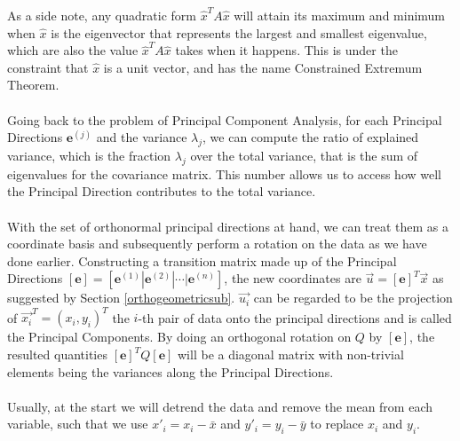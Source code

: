 As a side note, any quadratic form $\hat{x}^TA\hat{x}$ will attain its maximum and minimum when $\hat{x}$ is the eigenvector that represents the largest and smallest eigenvalue, which are also the value $\hat{x}^TA\hat{x}$ takes when it happens. This is under the constraint that $\hat{x}$ is a unit vector, and has the name Constrained Extremum Theorem.\\
\\
Going back to the problem of Principal Component Analysis, for each Principal Directions $\textbf{e}^{(j)}$ and the variance $\lambda_{j}$, we can compute the ratio of explained variance, which is the fraction $\lambda_{j}$ over the total variance, that is the sum of eigenvalues for the covariance matrix. This number allows us to access how well the Principal Direction contributes to the total variance.\\
\\
With the set of orthonormal principal directions at hand, we can treat them as a coordinate basis and subsequently perform a rotation on the data as we have done earlier. Constructing a transition matrix made up of the Principal Directions $[\textbf{e}] = [\textbf{e}^{(1)}|\textbf{e}^{(2)}|\cdots|\textbf{e}^{(n)}]$, the new coordinates are $\vec{u} = [\textbf{e}]^T \vec{x}$ as suggested by Section \ref{orthogeometricsub}. $\vec{u_i}$ can be regarded to be the projection of $\vec{x_i}^T = (x_i, y_i)^T$ the $i$-th pair of data onto the principal directions and is called the Principal Components. By doing an orthogonal rotation on $Q$ by $[\textbf{e}]$, the resulted quantities $[\textbf{e}]^T Q[\textbf{e}]$ will be a diagonal matrix with non-trivial elements being the variances along the Principal Directions. \\
\\
Usually, at the start we will detrend the data and remove the mean from each variable, such that we use $x'_i = x_i - \bar{x}$ and $y'_i = y_i - \bar{y}$ to replace $x_i$ and $y_i$.

